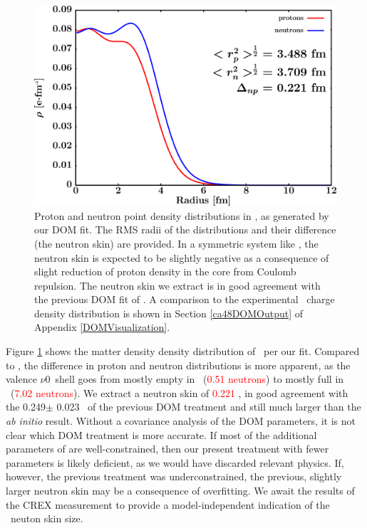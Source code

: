 \begin{figure}[tb]
    \centering
    \includegraphics[width=\textwidth]{figures/ca48_matterDensity.png}
    \caption[Proton and neutron matter density distributions in \caForty]
    {
        Proton and neutron point density distributions in \caForty, as
        generated by our DOM fit. The RMS radii of the distributions and their
        difference (the neutron skin) are provided. In a symmetric system like
        \caForty, the neutron skin is expected to be slightly negative as a
        consequence of slight reduction of proton density in the core from
        Coulomb repulsion. The neutron skin we extract is in good agreement with
        the previous DOM fit of \cite{MahzoonPhDThesis}. A comparison to the
        experimental \caEight\ charge density distribution is shown in Section
        \ref{ca48DOMOutput} of Appendix \ref{DOMVisualization}.
    }
    \label{Ca48MatterDist}
\end{figure}

Figure \ref{Ca48MatterDist} shows the matter density density distribution of \caEight\ per
our fit. Compared to \caForty, the difference in proton and neutron distributions is more apparent,
as the valence $\nu$0\fSeven\ shell goes from mostly empty in \caForty\
(\textcolor{red}{0.51 neutrons}) to 
mostly full in \caForty\ (\textcolor{red}{7.02 neutrons}).
We extract a neutron skin of \textcolor{red}{0.221} \femto\meter,
in good agreement with the 0.249$\pm$ 0.023 \femto\meter\ of the previous DOM treatment
and still much larger than the \textit{ab initio} result. Without a covariance analysis of the DOM
parameters, it is not clear which DOM treatment is more accurate.
If most of the additional parameters of
\cite{MahzoonPhDThesis} are well-constrained, then our present treatment with fewer parameters is 
likely deficient, as we would have discarded relevant physics. If, however, the previous treatment
was underconstrained, the previous, slightly larger neutron skin
may be a consequence of overfitting. We
await the results of the CREX measurement to provide a model-independent indication
of the \caEight\ neuton skin size.

